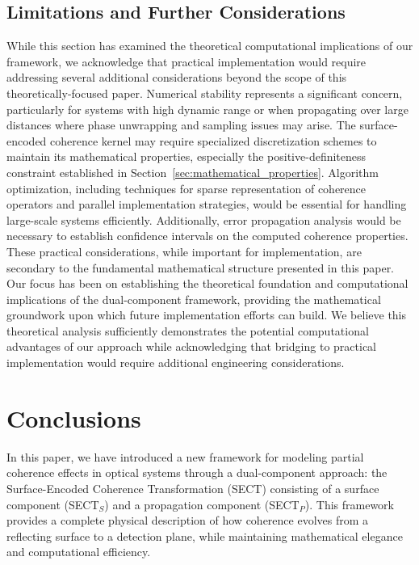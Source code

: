 \documentclass[a4paper,12pt]{article}
\begin{document}
\subsection{Limitations and Further Considerations}

While this section has examined the theoretical computational implications of our framework, we acknowledge that 
practical implementation would require addressing several additional considerations beyond the scope of this 
theoretically-focused paper. Numerical stability represents a significant concern, particularly for systems with 
high dynamic range or when propagating over large distances where phase unwrapping and sampling issues may arise. 
The surface-encoded coherence kernel may require specialized discretization schemes to maintain its mathematical 
properties, especially the positive-definiteness constraint established in Section~\ref{sec:mathematical_properties}. 
Algorithm optimization, including techniques for sparse representation of coherence operators and parallel implementation 
strategies, would be essential for handling large-scale systems efficiently. Additionally, error propagation analysis 
would be necessary to establish confidence intervals on the computed coherence properties. These practical considerations, 
while important for implementation, are secondary to the fundamental mathematical structure presented in this paper. 
Our focus has been on establishing the theoretical foundation and computational implications of the dual-component 
framework, providing the mathematical groundwork upon which future implementation efforts can build. We believe this 
theoretical analysis sufficiently demonstrates the potential computational advantages of our approach while 
acknowledging that bridging to practical implementation would require additional engineering considerations.


\section{Conclusions}

In this paper, we have introduced a new framework for modeling partial coherence effects in optical systems through a dual-component approach: the Surface-Encoded Coherence Transformation (SECT) consisting of a surface component (SECT$_S$) and a propagation component (SECT$_P$). This framework provides a complete physical description of how coherence evolves from a reflecting surface to a detection plane, while maintaining mathematical elegance and computational efficiency.
\end{document}
